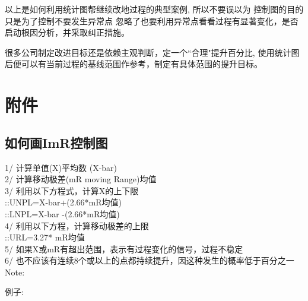 以上是如何利用统计图帮继续改地过程的典型案例, 所以不要误以为
控制图的目的只是为了控制不要发生异常点
忽略了也要利用异常点看看过程有显著变化，是否启动根因分析，并采取纠正措施。

很多公司制定改进目标还是依赖主观判断，定一个``合理"提升百分比,
使用统计图后便可以有当前过程的基线范围作参考，制定有具体范围的提升目标。

\hypertarget{ux9644ux4ef6}{%
\section{附件}\label{ux9644ux4ef6}}

\hypertarget{ux5982ux4f55ux753bimrux63a7ux5236ux56fe}{%
\subsection{如何画ImR控制图}\label{ux5982ux4f55ux753bimrux63a7ux5236ux56fe}}

1/ 计算单值(X)平均数 (X-bar)\\
2/ 计算移动极差(mR moving Range)均值\\
3/ 利用以下方程式，计算X的上下限\\
::UNPL=X-bar+(2.66*mR均值)\\
::LNPL=X-bar -(2.66*mR均值)\\
4/ 利用以下方程，计算移动极差的上限\\
::URL=3.27* mR均值\\
5/ 如果X或mR有超出范围，表示有过程变化的信号，过程不稳定\\
6/ 也不应该有连续8个或以上的点都持续提升，因这种发生的概率低于百分之一\\
Note:

\begin{description}
\item[]
\end{description}

例子:\\

